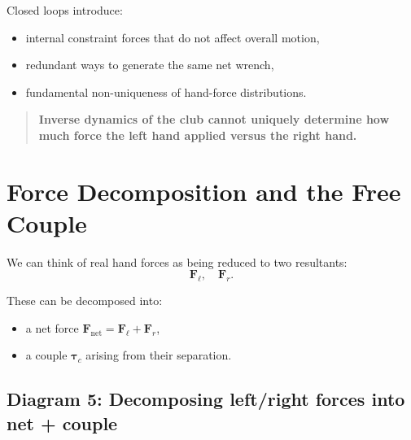 \documentclass[12pt]{article}
\begin{document}
Closed loops introduce:
\begin{itemize}
    \item internal constraint forces that do not affect overall motion,
    \item redundant ways to generate the same net wrench,
    \item fundamental non-uniqueness of hand-force distributions.
\end{itemize}

\begin{quote}
\textbf{Inverse dynamics of the club cannot uniquely determine how much force the left hand applied versus the right hand.}
\end{quote}

\section{Force Decomposition and the Free Couple}

We can think of real hand forces as being reduced to two resultants:
\[
\mathbf{F}_\ell, \quad \mathbf{F}_r.
\]

These can be decomposed into:
\begin{itemize}
    \item a net force $\mathbf{F}_{\mathrm{net}} = \mathbf{F}_\ell + \mathbf{F}_r$,
    \item a couple $\bm{\tau}_c$ arising from their separation.
\end{itemize}

\subsection*{Diagram 5: Decomposing left/right forces into net + couple}

\begin{center}
\end{center}
\end{document}
